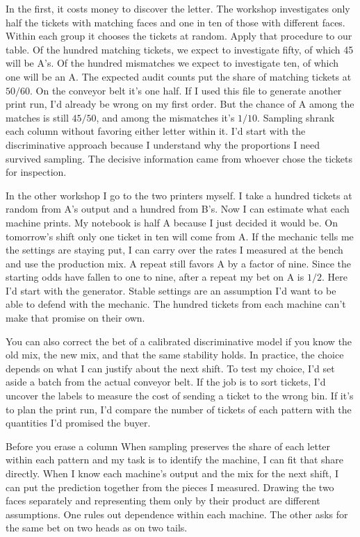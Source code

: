 In the first, it costs money to discover the letter. The workshop investigates only half the tickets with matching faces and one in ten of those with different faces. Within each group it chooses the tickets at random. Apply that procedure to our table. Of the hundred matching tickets, we expect to investigate fifty, of which 45 will be A's. Of the hundred mismatches we expect to investigate ten, of which one will be an A. The expected audit counts put the share of matching tickets at $50/60$. On the conveyor belt it's one half. If I used this file to generate another print run, I'd already be wrong on my first order. But the chance of A among the matches is still $45/50$, and among the mismatches it's $1/10$. Sampling shrank each column without favoring either letter within it. I'd start with the discriminative approach because I understand why the proportions I need survived sampling. The decisive information came from whoever chose the tickets for inspection.

In the other workshop I go to the two printers myself. I take a hundred tickets at random from A's output and a hundred from B's. Now I can estimate what each machine prints. My notebook is half A because I just decided it would be. On tomorrow's shift only one ticket in ten will come from A. If the mechanic tells me the settings are staying put, I can carry over the rates I measured at the bench and use the production mix. A repeat still favors A by a factor of nine. Since the starting odds have fallen to one to nine, after a repeat my bet on A is $1/2$. Here I'd start with the generator. Stable settings are an assumption I'd want to be able to defend with the mechanic. The hundred tickets from each machine can't make that promise on their own.

You can also correct the bet of a calibrated discriminative model if you know the old mix, the new mix, and that the same stability holds. In practice, the choice depends on what I can justify about the next shift. To test my choice, I'd set aside a batch from the actual conveyor belt. If the job is to sort tickets, I'd uncover the labels to measure the cost of sending a ticket to the wrong bin. If it's to plan the print run, I'd compare the number of tickets of each pattern with the quantities I'd promised the buyer.

\begin{quadro}{Before you erase a column}
 When sampling preserves the share of each letter within each pattern and my task is to identify the machine, I can fit that share directly. When I know each machine's output and the mix for the next shift, I can put the prediction together from the pieces I measured.
 Drawing the two faces separately and representing them only by their product are different assumptions. One rules out dependence within each machine. The other asks for the same bet on two heads as on two tails.
\end{quadro}

